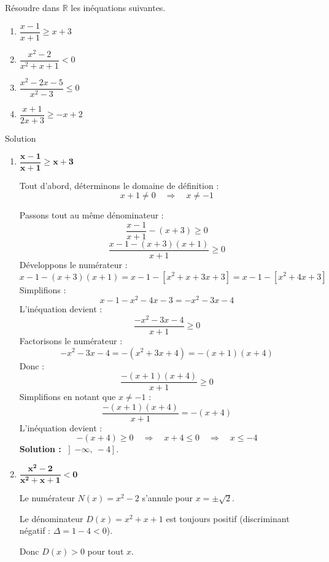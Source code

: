\documentclass[a4paper,12pt]{article}
\begin{document}
\begin{exercice}[title=Exercice 15 \quad$\star\star\star$\quad\  {[Calculer]}]{}{}
Résoudre dans \( \mathbb{R} \) les inéquations suivantes.
\begin{enumerate}
    \item \(\dfrac{x - 1}{x + 1} \geq x + 3\)
    \item \(\dfrac{x^2 - 2}{x^2+x+1} < 0\)
    \item \(\dfrac{x^2 -2x -5}{x^2 - 3} \leq 0\)
    \item \(\dfrac{x + 1}{2x + 3} \geq -x + 2\)
\end{enumerate}
\end{exercice}

\begin{solutionbox}{Solution}
\begin{enumerate}
    \item \(\boldsymbol{\dfrac{x - 1}{x + 1} \geq x + 3}\)

    Tout d'abord, déterminons le domaine de définition :
    \[
    x + 1 \neq 0 \quad \Rightarrow \quad x \neq -1
    \]

    Passons tout au même dénominateur :
    \[
    \dfrac{x - 1}{x + 1} - (x + 3) \geq 0
    \]
    \[
    \dfrac{x - 1 - (x + 3)(x + 1)}{x + 1} \geq 0
    \]
    Développons le numérateur :
    \[
    x - 1 - (x + 3)(x + 1) = x - 1 - [x^2 + x + 3x + 3] = x - 1 - [x^2 + 4x + 3]
    \]
    Simplifions :
    \[
    x - 1 - x^2 - 4x - 3 = -x^2 - 3x - 4
    \]
    L'inéquation devient :
    \[
    \dfrac{-x^2 - 3x - 4}{x + 1} \geq 0
    \]
    Factorisons le numérateur :
    \[
    -x^2 - 3x - 4 = -(x^2 + 3x + 4) = -(x + 1)(x + 4)
    \]
    Donc :
    \[
    \dfrac{-(x + 1)(x + 4)}{x + 1} \geq 0
    \]
    Simplifions en notant que \(x \neq -1\) :
    \[
    \dfrac{-(x + 1)(x + 4)}{x + 1} = - (x + 4)
    \]
    L'inéquation devient :
    \[
    - (x + 4) \geq 0 \quad \Rightarrow \quad x + 4 \leq 0 \quad \Rightarrow \quad x \leq -4
    \]
    \textbf{Solution :} \( \left]-\infty,\ -4\right] \).

    \item \(\boldsymbol{\dfrac{x^2 - 2}{x^2 + x + 1} < 0}\)

    Le numérateur \(N(x) = x^2 - 2\) s'annule pour \(x = \pm \sqrt{2}\).

    Le dénominateur \(D(x) = x^2 + x + 1\) est toujours positif (discriminant négatif : \(\Delta = 1 - 4 < 0\)).

    Donc \(D(x) > 0\) pour tout \(x\).


\end{enumerate}
\end{solutionbox}
\end{document}
